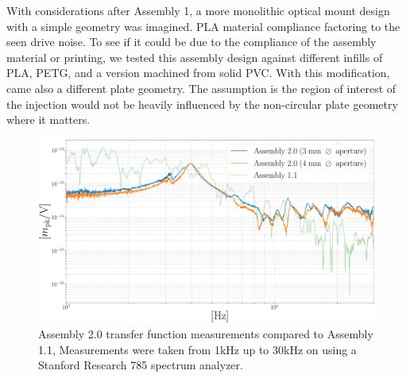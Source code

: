 With considerations after Assembly 1, a more monolithic optical mount design with a simple geometry was imagined. PLA material compliance factoring to the seen drive noise. To see if it could be due to the compliance of the assembly material or printing, we tested this assembly design against different infills of PLA, PETG, and a version machined from solid PVC. With this modification, came also a different plate geometry. The assumption is the region of interest of the injection would not be heavily influenced by the non-circular plate geometry where it matters.



\begin{figure}[H]
    \includegraphics[width=\textwidth]{figs/ALGAAS/results_figs/assembly2/2_0_compare_1_1.pdf} 
    \caption{Assembly 2.0 transfer function measurements compared to Assembly 1.1, Measurements were taken from 1kHz up to 30kHz on using a Stanford Research 785 spectrum analyzer.}
    \label{fig:assembly2and1_1}
\end{figure}


